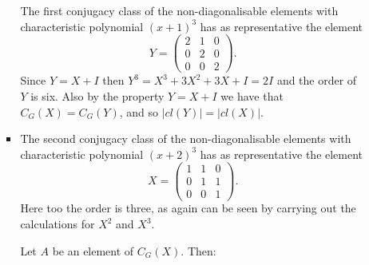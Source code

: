 \documentclass[11pt]{article} \usepackage{amssymb}
\begin{document}
\begin{enumerate}
\begin{enumerate}
\begin{itemize}
        The first conjugacy class of the non-diagonalisable elements with 
        characteristic polynomial
        $(x+1)^3$ has as representative the element
        \begin{equation*}
          Y=
          \begin{pmatrix}
            2&1  &0 \\ 
            0&2  &0 \\ 
            0&0  &2 
          \end{pmatrix}.
        \end{equation*}
        Since $Y=X+I$ then $Y^3=X^3+3X^2+3X+I=2I$ and the order of $Y$ is six.
        Also by the property $Y=X+I$ we have that $C_G(X)=C_G(Y)$, and so
        $|cl(Y)|=|cl(X)|$.
        
      \item
        The second conjugacy class of the non-diagonalisable elements with 
        characteristic polynomial
        $(x+2)^3$ has as representative the element
        \begin{equation*}
          X=
          \begin{pmatrix}
            1&1  &0 \\ 
            0&1  &1 \\ 
            0&0  &1 
          \end{pmatrix}.
        \end{equation*}
        Here too the order is three, as again can be seen by carrying out the 
        calculations for $X^2$ and $X^3$.

        Let $A$ be an element of $C_G(X)$. Then:
        

\end{itemize}
\end{enumerate}
\end{enumerate}
\end{document}
